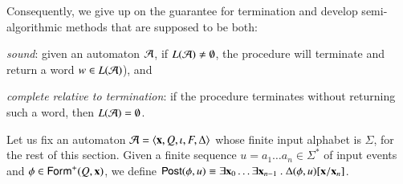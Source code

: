 \documentclass{llncs}
\begin{document}
Consequently, we give up on the guarantee for termination and develop
semi-algorithmic methods that are supposed to be
both: \begin{compactenum}
\item \emph{sound}: given an automaton $\mathcal{A}$, if $L(\mathcal{A}) \neq\emptyset$,
  the procedure will terminate and return a word $w \in L(\mathcal{A})$), and
%
\item \emph{complete relative to termination}: if the procedure terminates
  without returning such a word, then $L(\mathcal{A}) = \emptyset$. 
\end{compactenum}

Let us fix an automaton $\mathcal{A} = \left\langle \mathbf x,Q,\iota,F,\Delta \right\rangle$ whose
finite input alphabet is $\Sigma$, for the rest of this section. Given
a finite sequence $u = a_1\ldots a_n \in \Sigma^*$ of input events and
$\phi \in \mathsf{Form}^+(Q,\mathbf x)$, we define $\mathsf{Post}(\phi,u) \equiv \exists
\mathbf x_0 \ldots \exists \mathbf x_{n-1} ~.~
\Delta(\phi,u)[\mathbf x/\mathbf x_n]$. 


 

\end{document}
